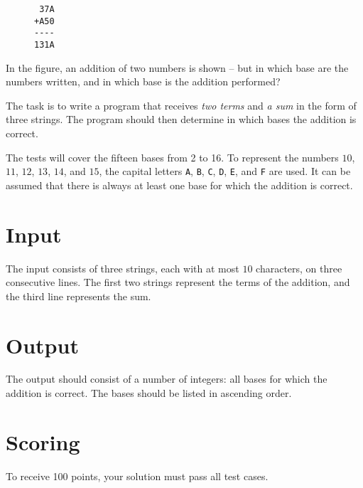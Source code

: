 
\begin{figure}
\centering
\begin{verbatim}
 37A
+A50
----
131A
\end{verbatim}
\end{figure}

In the figure, an addition of two numbers is shown -- but in which base are the numbers written, and
in which base is the addition performed?

The task is to write a program that receives \emph{two terms} and \emph{a sum} in the form
of three strings. The program should then determine in which bases the addition is correct.

The tests will cover the fifteen bases from 2 to 16. To represent the numbers $10$, $11$, $12$, $13$, $14$, and $15$, 
the capital letters \texttt{A}, \texttt{B}, \texttt{C}, \texttt{D}, \texttt{E}, and \texttt{F} are used. 
It can be assumed that there is always at least one base for which the addition is correct.

\section*{Input}
The input consists of three strings, each with at most $10$ characters, on three consecutive lines. 
The first two strings represent the terms of the addition, and the third line represents the sum.

\section*{Output}
The output should consist of a number of integers: all bases for which the addition is correct. 
The bases should be listed in ascending order.

\section*{Scoring}
To receive 100 points, your solution must pass all test cases.
